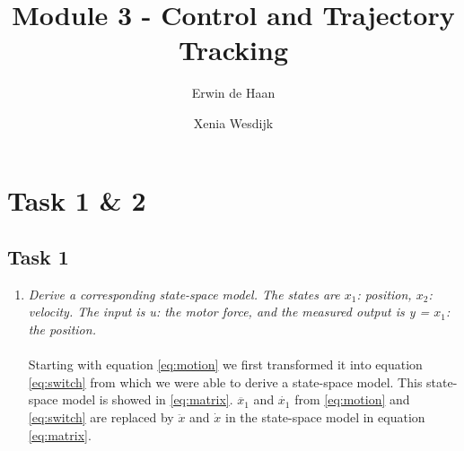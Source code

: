 \documentclass[final]{scrreprt} %
\title{Module 3 - Control and Trajectory Tracking}
\author{Erwin {de Haan} \and Xenia {Wesdijk}}
\begin{document}
\chapter{Task 1 \& 2}
\label{ch:mod3-tsk1-2}

\section{Task 1}
\label{sec:mod3-tsk1}

\begin{enumerate}
\item \textit{Derive a corresponding state-space model. The states are $x_{1}$: position, $x_{2}$: velocity. The input is u: the motor force, and the measured output is y = $x_{1}$: the position.}\\
\\
Starting with equation \ref{eq:motion} we first transformed it into equation \ref{eq:switch} from which we were able to derive a state-space model. This state-space model is showed in \ref{eq:matrix}. $\ddot{x_{1}}$ and $\dot{x_{1}}$ from \ref{eq:motion} and \ref{eq:switch} are replaced by $\ddot{x}$ and $\dot{x}$ in the state-space model in equation \ref{eq:matrix}.


\end{enumerate}
\end{document}
